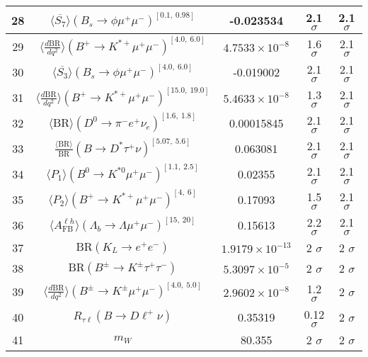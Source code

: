 \begin{longtable}{|c|c|c|c|c|}
28 &	 $\langle \overline{S_7}\rangle(B_s\to \phi \mu^+\mu^-)^{[0.1,\  0.98]}$ &	 -0.023534 &	 \cellcolor{green!0}2.1 $ \sigma$ &	 2.1 $ \sigma$ \\ \hline
29 &	 $\langle \frac{d\mathrm{BR}}{dq^2} \rangle(B^+\to K^{\ast +}\mu^+\mu^-)^{[4.0,\  6.0]}$ &	 $4.7533\times 10^{-8}$ &	 \cellcolor{green!25}1.6 $ \sigma$ &	 2.1 $ \sigma$ \\ \hline
30 &	 $\langle \overline{S_3}\rangle(B_s\to \phi \mu^+\mu^-)^{[4.0,\  6.0]}$ &	 -0.019002 &	 \cellcolor{red!0}2.1 $ \sigma$ &	 2.1 $ \sigma$ \\ \hline
31 &	 $\langle \frac{d\mathrm{BR}}{dq^2} \rangle(B^+\to K^{\ast +}\mu^+\mu^-)^{[15.0,\  19.0]}$ &	 $5.4633\times 10^{-8}$ &	 \cellcolor{green!40}1.3 $ \sigma$ &	 2.1 $ \sigma$ \\ \hline
32 &	 $\langle\mathrm{BR}\rangle(D^0\to \pi^- e^+\nu_e)^{[1.6,\  1.8]}$ &	 0.00015845 &	 \cellcolor{red!0}2.1 $ \sigma$ &	 2.1 $ \sigma$ \\ \hline
33 &	 $\frac{\langle \mathrm{BR} \rangle}{\mathrm{BR}}(B\to D^\ast\tau^+\nu)^{[5.07,\  5.6]}$ &	 0.063081 &	 \cellcolor{green!0}2.1 $ \sigma$ &	 2.1 $ \sigma$ \\ \hline
34 &	 $\langle P_1\rangle(B^0\to K^{\ast 0}\mu^+\mu^-)^{[1.1,\  2.5]}$ &	 0.02355 &	 \cellcolor{green!0}2.1 $ \sigma$ &	 2.1 $ \sigma$ \\ \hline
35 &	 $\langle P_2\rangle(B^+\to K^{\ast +}\mu^+\mu^-)^{[4,\  6]}$ &	 0.17093 &	 \cellcolor{green!28}1.5 $ \sigma$ &	 2.1 $ \sigma$ \\ \hline
36 &	 $\langle A_\mathrm{FB}^{\ell h}\rangle(\Lambda_b\to\Lambda \mu^+\mu^-)^{[15,\  20]}$ &	 0.15613 &	 \cellcolor{red!8}2.2 $ \sigma$ &	 2.1 $ \sigma$ \\ \hline
37 &	 $\mathrm{BR}(K_L\to e^+e^-)$ &	 $1.9179\times 10^{-13}$ &	 \cellcolor{green!0}2 $ \sigma$ &	 2 $ \sigma$ \\ \hline
38 &	 $\mathrm{BR}(B^\pm\to K^\pm \tau^+\tau^-)$ &	 $5.3097\times 10^{-5}$ &	 \cellcolor{green!3}2 $ \sigma$ &	 2 $ \sigma$ \\ \hline
39 &	 $\langle \frac{d\mathrm{BR}}{dq^2} \rangle(B^\pm\to K^\pm \mu^+\mu^-)^{[4.0,\  5.0]}$ &	 $2.9602\times 10^{-8}$ &	 \cellcolor{green!40}1.2 $ \sigma$ &	 2 $ \sigma$ \\ \hline
40 &	 $R_{\tau \ell}(B\to D\ell^+\nu)$ &	 0.35319 &	 \cellcolor{green!50}0.12 $ \sigma$ &	 2 $ \sigma$ \\ \hline
41 &	 $m_W$ &	 80.355 &	 \cellcolor{green!0}2 $ \sigma$ &	 2 $ \sigma$ \\ \hline

\end{longtable}
